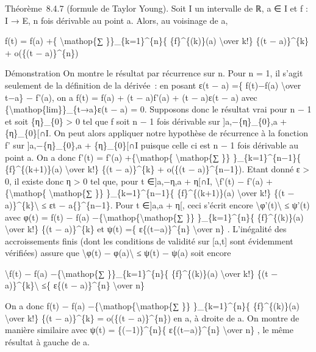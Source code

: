 \documentclass[]{article}
\begin{document}
Théorème~8.4.7 (formule de Taylor Young). Soit I un intervalle de ℝ, a ∈
I et f : I → E, n fois dérivable au point a. Alors, au voisinage de a,

f(t) = f(a) +\{ \textbackslash{}mathop\{∑ \}\}\_\{k=1\}\^{}\{n\}\{
\{f\}\^{}\{(k)\}(a) \textbackslash{}over k!\} \{(t − a)\}\^{}\{k\} +
o(\{(t − a)\}\^{}\{n\})

Démonstration On montre le résultat par récurrence sur n. Pour n = 1, il
s'agit seulement de la définition de la dérivée~: en posant ε(t − a) =\{
f(t)−f(a) \textbackslash{}over t−a\} − f'(a), on a f(t) = f(a) + (t −
a)f'(a) + (t − a)ε(t − a) avec
\{\textbackslash{}mathop\{lim\}\}\_\{t→a\}ε(t − a) = 0. Supposons donc
le résultat vrai pour n − 1 et soit \{η\}\_\{0\} \textgreater{} 0 tel
que f soit n − 1 fois dérivable sur {]}a,−\{η\}\_\{0\},a +
\{η\}\_\{0\}{[}∩I. On peut alors appliquer notre hypothèse de récurrence
à la fonction f' sur {]}a,−\{η\}\_\{0\},a + \{η\}\_\{0\}{[}∩I puisque
celle ci est n − 1 fois dérivable au point a. On a donc f'(t) = f'(a)
+\{\textbackslash{}mathop\{ \textbackslash{}mathop\{∑ \}\}
\}\_\{k=1\}\^{}\{n−1\}\{ \{f\}\^{}\{(k+1)\}(a) \textbackslash{}over k!\}
\{(t − a)\}\^{}\{k\} + o(\{(t − a)\}\^{}\{n−1\}). Etant donné ε
\textgreater{} 0, il existe donc η \textgreater{} 0 tel que, pour t
∈{]}a,−η,a + η{[}∩I, \textbackslash{}\textbar{}f'(t) − f'(a)
+\{\textbackslash{}mathop\{ \textbackslash{}mathop\{∑ \}\}
\}\_\{k=1\}\^{}\{n−1\}\{ \{f\}\^{}\{(k+1)\}(a) \textbackslash{}over k!\}
\{(t − a)\}\^{}\{k\}\textbackslash{}\textbar{} ≤ ε\textbar{}t −
a\{\textbar{}\}\^{}\{n−1\}. Pour t ∈{]}a,a + η{[}, ceci s'écrit encore
\textbackslash{}\textbar{}φ'(t)\textbackslash{}\textbar{} ≤ ψ'(t) avec
φ(t) = f(t) − f(a) −\{\textbackslash{}mathop\{\textbackslash{}mathop\{∑
\}\} \}\_\{k=1\}\^{}\{n\}\{ \{f\}\^{}\{(k)\}(a) \textbackslash{}over
k!\} \{(t − a)\}\^{}\{k\} et ψ(t) =\{ ε\{(t−a)\}\^{}\{n\}
\textbackslash{}over n\} . L'inégalité des accroissements finis (dont
les conditions de validité sur {[}a,t{]} sont évidemment vérifiées)
assure que \textbackslash{}\textbar{}φ(t) −
φ(a)\textbackslash{}\textbar{} ≤ ψ(t) − ψ(a) soit encore

\textbackslash{}\textbar{}f(t) − f(a) −\{\textbackslash{}mathop\{∑
\}\}\_\{k=1\}\^{}\{n\}\{ \{f\}\^{}\{(k)\}(a) \textbackslash{}over k!\}
\{(t − a)\}\^{}\{k\}\textbackslash{}\textbar{} ≤\{ ε\{(t − a)\}\^{}\{n\}
\textbackslash{}over n\}

On a donc f(t) − f(a)
−\{\textbackslash{}mathop\{\textbackslash{}mathop\{∑ \}\}
\}\_\{k=1\}\^{}\{n\}\{ \{f\}\^{}\{(k)\}(a) \textbackslash{}over k!\}
\{(t − a)\}\^{}\{k\} = o(\{(t − a)\}\^{}\{n\}) en a, à droite de a. On
montre de manière similaire avec ψ(t) = \{(−1)\}\^{}\{n\}\{
ε\{(t−a)\}\^{}\{n\} \textbackslash{}over n\} , le même résultat à gauche
de a.
\end{document}
